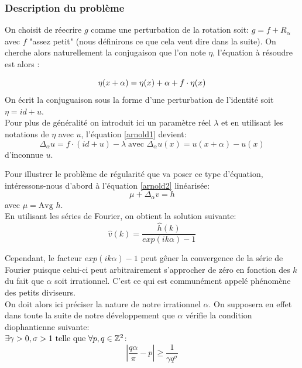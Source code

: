 \documentclass[11pt,a4paper]{article}
\begin{document}
\subsubsection{Description du problème}
On choisit de réecrire $g$ comme une perturbation de la rotation soit: $g= f + R_\alpha$ avec $f$ "assez petit" (nous définirons ce que cela veut dire dans la suite). On cherche alors naturellement la conjugaison que l'on note $\eta$, l'équation à résoudre est alors :

\begin{equation}\label{arnold1}
\eta(x + \alpha)= \eta(x) + \alpha + f \cdot \eta(x) \\
\end{equation}
On écrit la conjuguaison sous la forme d'une perturbation de l'identité soit $\eta=id+u$. \\
Pour plus de généralité on introduit ici un paramètre réel $\lambda$ et en utilisant les notations de $\eta$ avec $u$, l'équation \eqref{arnold1} devient:
\begin{equation}\label{arnold2}
\Delta_\alpha u= f \cdot (id +u) - \lambda \; \text{avec  } \Delta_\alpha u(x)= u(x+\alpha) - u(x)
\end{equation}
d'inconnue $u$.
\par Pour illustrer le problème de régularité que va poser ce type d'équation, intéressons-nous d'abord à l'équation \eqref{arnold2} linéarisée:
\begin{equation}\label{arnold3}
\mu + \Delta_\alpha v = h 
\end{equation}
avec $\mu= \text{Avg } h$. \\
En utilisant les séries de Fourier, on obtient la solution suivante:
\begin{equation*}
\hat{v}(k)=\frac{\hat{h}(k)}{exp(ik \alpha) - 1}
\end{equation*}

Cependant, le facteur $exp(ik \alpha) - 1$ peut gêner la convergence de la série de Fourier puisque celui-ci peut arbitrairement s'approcher de zéro en fonction des $k$ du fait que $\alpha$ soit irrationnel. C'est ce qui est communément appelé phénomène des petits diviseurs. \\
On doit alors ici préciser la nature de notre irrationnel $\alpha$. On supposera en effet dans toute la suite de notre développement que $\alpha$ vérifie la condition diophantienne suivante: \\
 $ \exists \gamma>0,\sigma>1 \ \text{telle que} \ \forall p,q \in \mathbb Z^2 $:
\begin{equation}
|\frac{q \alpha}{\pi}-p|\geq \frac{1}{\gamma q^\sigma}
\end{equation} 
\end{document}
